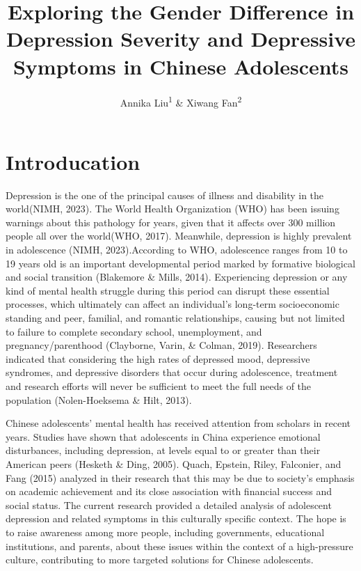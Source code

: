 \documentclass[
  man,floatsintext]{apa6}
\title{Exploring the Gender Difference in Depression Severity and Depressive Symptoms in Chinese Adolescents}
\author{Annika Liu\textsuperscript{1} \& Xiwang Fan\textsuperscript{2}}
\date{}
\affiliation{\phantom{0}}
\begin{document}
\maketitle

\hypertarget{introducation}{%
\section{Introducation}\label{introducation}}

Depression is the one of the principal causes of illness and disability in the world(NIMH, 2023). The World Health Organization (WHO) has been issuing warnings about this pathology for years, given that it affects over 300 million people all over the world(WHO, 2017). Meanwhile, depression is highly prevalent in adolescence (NIMH, 2023).According to WHO, adolescence ranges from 10 to 19 years old is an important developmental period marked by formative biological and social transition (Blakemore \& Mills, 2014). Experiencing depression or any kind of mental health struggle during this period can disrupt these essential processes, which ultimately can affect an individual's long-term socioeconomic standing and peer, familial, and romantic relationships, causing but not limited to failure to complete secondary school, unemployment, and pregnancy/parenthood (Clayborne, Varin, \& Colman, 2019). Researchers indicated that considering the high rates of depressed mood, depressive syndromes, and depressive disorders that occur during adolescence, treatment and research efforts will never be sufficient to meet the full needs of the population (Nolen-Hoeksema \& Hilt, 2013).

Chinese adolescents' mental health has received attention from scholars in recent years. Studies have shown that adolescents in China experience emotional disturbances, including depression, at levels equal to or greater than their American peers (Hesketh \& Ding, 2005). Quach, Epstein, Riley, Falconier, and Fang (2015) analyzed in their research that this may be due to society's emphasis on academic achievement and its close association with financial success and social status. The current research provided a detailed analysis of adolescent depression and related symptoms in this culturally specific context. The hope is to raise awareness among more people, including governments, educational institutions, and parents, about these issues within the context of a high-pressure culture, contributing to more targeted solutions for Chinese adolescents.
\end{document}
